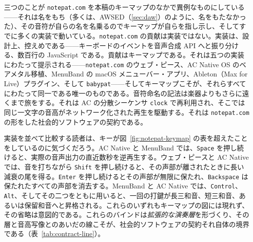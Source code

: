 \documentclass[10pt,letterpaper,twocolumn]{article}
\begin{document}
三つのことが \texttt{notepat.com} を本稿のキーマップのなかで異例なものにしている——それは名をもち（多くは、AWSED（\textsection\ref{sec:daw}）のように、名をもたなかった）、その音符が自らの名を名乗るのでキーマップが自らを指し示し、そしてすでに多くの実装で動いている。\texttt{notepat.com} の貢献は実装ではない。実装は、設計上、控えめである——キーボードのイベントを音声合成 API へと振り分ける、数百行の JavaScript である。貢献はキーマップである。それは五つの実装にわたって提示される——\texttt{notepat.com} のウェブ・ピース、AC Native OS のベアメタル移植、MenuBand の macOS メニューバー・アプリ、Ableton（Max for Live）プラグイン、そして \texttt{babypat}——そしてキーマップこそが、それらすべてにわたって同一である唯一のものである。音符命名の記法は楽器よりもさらに遠くまで旅をする。それは AC の分散シーケンサ \texttt{clock} で再利用され、そこでは同じ一文字の音高がネットワーク化された再生を駆動する。それは \texttt{notepat.com} の形をした社会的ソフトウェアの契約である。

実装を並べて比較する読者は、キーが図~\ref{fig:notepat-keymap} の表を超えたことをしているのに気づくだろう。AC Native と MenuBand では、\texttt{Space} を押し続けると、実際の音声出力の直近数秒を逆再生する。ウェブ・ピースと AC Native では、音を打ちながら \texttt{Shift} を押し続けると、その声部が離されたときに長い減衰の尾を得る。\texttt{Enter} を押し続けるとその声部が無限に保たれ、\texttt{Backspace} は保たれたすべての声部を消去する。MenuBand と AC Native では、\texttt{Control}、\texttt{Alt}、そしてその二つをともに用いると、一回の打鍵が長三和音、短三和音、あるいは保留和音へと昇格される。これらのいずれもキーマップの図には現れず、その省略は意図的である。これらのバインドは\emph{拡張的な演奏層}を形づくり、その層と音高写像とのあいだの線こそが、社会的ソフトウェアの契約それ自体の境界である（表~\ref{tab:contract-line}）。
\end{document}
